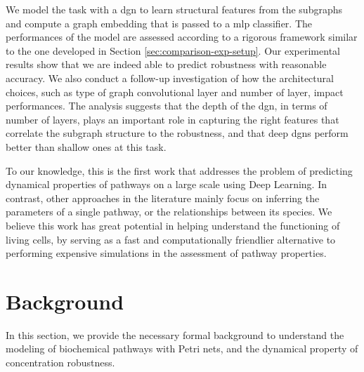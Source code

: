 We model the task with a \gls{dgn} to learn structural features from the subgraphs and compute a graph embedding that is passed to a \gls{mlp} classifier. The performances of the model are assessed according to a rigorous framework similar to the one developed in Section \ref{sec:comparison-exp-setup}. Our experimental results show that we are indeed able to predict robustness with reasonable accuracy. We also conduct a follow-up investigation of how the architectural choices, such as type of graph convolutional layer and number of layer, impact performances. The analysis suggests that the depth of the \gls{dgn}, in terms of number of layers, plays an important role in capturing the right features that correlate the subgraph structure to the robustness, and that deep \glspl{dgn} perform better than shallow ones at this task.

To our knowledge, this is the first work that addresses the problem of predicting dynamical properties of pathways on a large scale using Deep Learning. In contrast, other approaches in the literature mainly focus on inferring the parameters of a single pathway, or the relationships between its species. We believe this work has great potential in helping understand the functioning of living cells, by serving as a fast and computationally friendlier alternative to performing expensive simulations in the assessment of pathway properties.

\section{Background}\label{sect:background}
In this section, we provide the necessary formal background to understand the modeling of biochemical pathways with Petri nets, and the dynamical property of concentration robustness.

